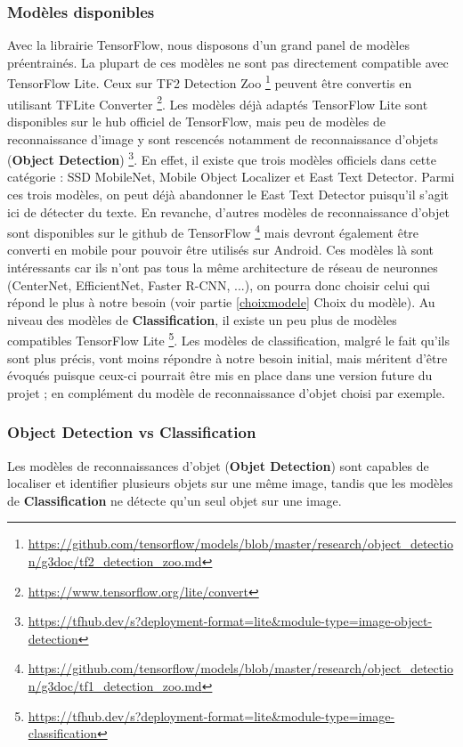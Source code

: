 \documentclass[UTF8]{EPURapport}
\begin{document}
\subsubsection{Modèles disponibles}
Avec la librairie TensorFlow, nous disposons d'un grand panel de modèles préentrainés. La plupart de ces modèles ne sont pas directement compatible avec TensorFlow Lite. Ceux sur TF2 Detection Zoo \footnote{\url{https://github.com/tensorflow/models/blob/master/research/object_detection/g3doc/tf2_detection_zoo.md}} peuvent être convertis en utilisant TFLite Converter \footnote{\url{https://www.tensorflow.org/lite/convert}}. Les modèles déjà adaptés TensorFlow Lite sont disponibles sur le hub officiel de TensorFlow, mais peu de modèles de reconnaissance d'image y sont rescencés notamment de reconnaissance d'objets (\textbf{Object Detection}) \footnote{\url{https://tfhub.dev/s?deployment-format=lite&module-type=image-object-detection}}. En effet, il existe que trois modèles officiels dans cette catégorie : SSD MobileNet, Mobile Object Localizer et East Text Detector. Parmi ces trois modèles, on peut déjà abandonner le East Text Detector puisqu'il s'agit ici de détecter du texte. En revanche, d'autres modèles de reconnaissance d'objet sont disponibles sur le github de TensorFlow \footnote{\url{https://github.com/tensorflow/models/blob/master/research/object_detection/g3doc/tf1_detection_zoo.md}} mais devront également être converti en mobile pour pouvoir être utilisés sur Android. Ces modèles là sont intéressants car ils n'ont pas tous la même architecture de réseau de neuronnes (CenterNet, EfficientNet, Faster R-CNN, ...), on pourra donc choisir celui qui répond le plus à notre besoin (voir partie \ref{choixmodele} Choix du modèle). Au niveau des modèles de \textbf{Classification}, il existe un peu plus de modèles compatibles TensorFlow Lite \footnote{\url{https://tfhub.dev/s?deployment-format=lite&module-type=image-classification}}. Les modèles de classification, malgré le fait qu'ils sont plus précis, vont moins répondre à notre besoin initial, mais méritent d'être évoqués puisque ceux-ci pourrait être mis en place dans une version future du projet ; en complément du modèle de reconnaissance d'objet choisi par exemple.

\subsubsection{Object Detection vs Classification}
Les modèles de reconnaissances d'objet (\textbf{Objet Detection}) sont capables de localiser et identifier plusieurs objets sur une même image, tandis que les modèles de \textbf{Classification} ne détecte qu'un seul objet sur une image.
\newpage
\end{document}
